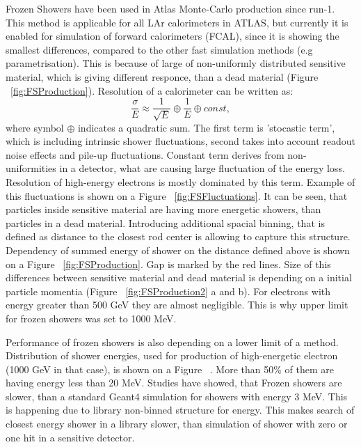 Frozen Showers have been used in Atlas Monte-Carlo production since run-1. This method is applicable for all LAr calorimeters in ATLAS, but currently it is enabled for simulation of forward calorimeters (FCAL), since it is showing the smallest differences, compared to the other fast simulation methods (e.g parametrisation). This is because of large of non-uniformly distributed sensitive material, which is giving different responce, than a dead material (Figure ~\ref{fig:FSProduction}). Resolution of a calorimeter can be written as:
\begin{equation}
\frac{\sigma}{E} \approx \frac{1}{\sqrt{E}}	\oplus \frac{1}{E} 	\oplus const,
\end{equation}
where symbol $\oplus$ indicates a quadratic sum. The first term is 'stocastic term', which is including intrinsic shower fluctuations, second takes into account readout noise effects and pile-up fluctuations. Constant term derives from non-uniformities in a detector, what are causing large fluctuation of the energy loss. Resolution of high-energy electrons is mostly dominated by this term. Example of this fluctuations is shown on a Figure ~\ref{fig:FSFluctuations}. It can be seen, that particles inside sensitive material are having more energetic showers, than particles in a dead material. Introducing additional spacial binning, that is defined as distance to the closest rod center is allowing to capture this structure. Dependency of summed energy of shower on the distance defined above is shown on a Figure ~\ref{fig:FSProduction}. Gap is marked by the red lines. Size of this differences between sensitive material and dead material is depending on a initial particle momentia (Figure ~\ref{fig:FSProduction2} a and b). For electrons with energy greater than 500 GeV they are almost negligible. This is why upper limit for frozen showers was set to 1000 MeV.
\begin{figure}
\end{figure}

Performance of frozen showers is also depending on a lower limit of a method. 
Distribution of shower energies, used for production of high-energetic electron (1000 GeV in that case), is shown on a Figure ~. More than 50\% of them are having energy less than 20 MeV. Studies have showed, that Frozen showers are slower, than a standard Geant4 simulation for showers with energy 3 MeV. This is happening due to library non-binned structure for energy. This makes search of closest energy shower in a library slower, than simulation of shower with zero or one hit in a sensitive detector. 

